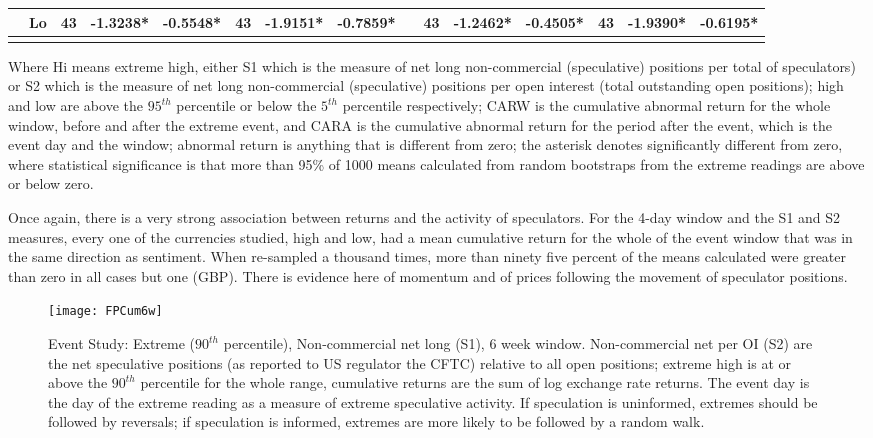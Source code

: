 \documentclass[ijfs,article,submit,oneauthor,pdftex,10pt,a4paper]{mdpi}
\begin{document}
{\begin{sidewaystable}
\begin{threeparttable}
\begin{tabular}{llccccccccccccc}
& Lo & 43 &-1.3238* & -0.5548* & 43 & -1.9151* & -0.7859* & & 43 & -1.2462* & -0.4505*  &43 & -1.9390*  & -0.6195*  \\
\hline
\label{tabref:SP1}
\end{tabular}
\begin{tablenotes}
\small 
\item Where Hi means extreme high, either S1 which is the measure of net long non-commercial (speculative) positions per total of speculators) or S2 which is the measure of net long non-commercial (speculative) positions per open interest (total outstanding open positions); high and low are above the $95^{th}$ percentile or below the $5^{th}$ percentile respectively; CARW is the cumulative abnormal return for the whole window, before and after the extreme event, and CARA is the cumulative abnormal return for the period after the event, which is the event day and the window; abnormal return is anything that is different from zero; the asterisk denotes significantly different from zero, where statistical significance is that more than 95\% of 1000 means calculated from random bootstraps from the extreme readings are above or below zero.   
\end{tablenotes}	
\end{threeparttable}  
\end{sidewaystable}

Once again, there is a very strong association between returns and the activity of speculators.  For the 4-day window and the S1 and S2 measures, every one of the currencies studied, high and low, had a mean cumulative return for the whole of the event window that was in the same direction as sentiment.  When re-sampled a thousand times, more than ninety five percent of the means calculated were greater than zero in all cases but one (GBP).  There is evidence here of momentum and of prices following the movement of speculator positions. 

\begin{figure}
\graphicspath{{../Figures/}}
\centering
\texttt{[image: FPCum6w]}
\caption{Event Study:  Extreme ($90^{th}$ percentile), Non-commercial net long (S1), 6 week window. Non-commercial net per OI (S2) are the net speculative positions (as reported to US regulator the CFTC) relative to all open positions; extreme high is at or above the $90^{th}$ percentile for the whole range, cumulative returns are the sum of log exchange rate returns. The event day is the day of the extreme reading as a measure of extreme speculative activity.  If speculation is uninformed, extremes should be followed by reversals; if speculation is informed, extremes are more likely to be followed by a random walk.}


\end{figure}}
\end{document}
